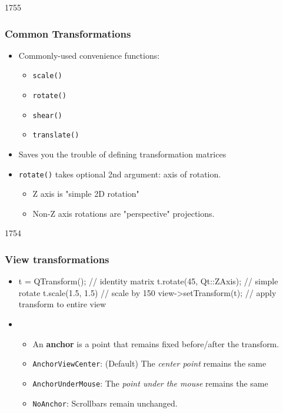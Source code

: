 \begin{slide}{1755}

\frametitle{Common Transformations}
\begin{itemize}

\item Commonly-used convenience functions:
    \begin{itemize}
    \item \texttt{scale()}
    \item \texttt{rotate()}
    \item \texttt{shear()}
    \item \texttt{translate()}
    \end{itemize}
\item Saves you the trouble of defining transformation matrices 
\item \texttt{rotate()} takes optional 2nd argument: axis of rotation.
    \begin{itemize}
    \item Z axis is "simple 2D rotation"
    \item Non-Z axis rotations are "perspective" projections. 
    \end{itemize}
\end{itemize}
\end{slide}


\begin{slide}[fragile]{1754}\frametitle{View transformations}


\begin{itemize}
\item[] \begin{cpp}

    t = QTransform();        // identity matrix
    t.rotate(45, Qt::ZAxis); // simple rotate
    t.scale(1.5, 1.5)        // scale by 150%
    view->setTransform(t);   // apply transform to entire view
\end{cpp}

\item {}
    \begin{itemize}
    \item An \textbf{anchor} is a point that remains fixed before/after the transform.
    \item \texttt{AnchorViewCenter}: (Default) The \textit{center point} remains the same 
    \item \texttt{AnchorUnderMouse}: The \textit{point under the mouse} remains the same
    \item \texttt{NoAnchor}: Scrollbars remain unchanged.
    \end{itemize}
\end{itemize}
\end{slide}


